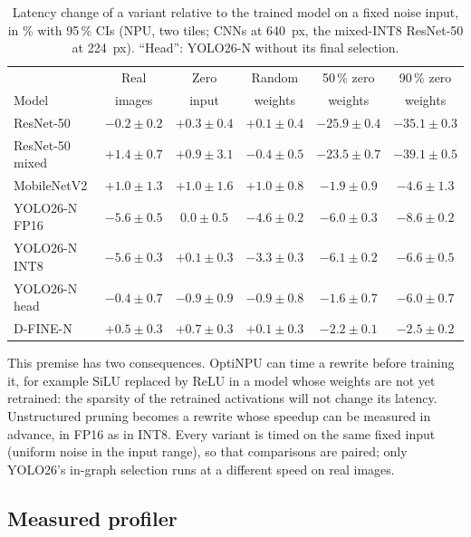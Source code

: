 \documentclass[conference]{IEEEtran}
\newcommand{\tool}{OptiNPU}
\begin{document}
\begin{table}[t]
\caption{Latency change of a variant relative to the trained model on a fixed noise input, in \% with 95\,\% CIs (NPU, two tiles; CNNs at 640~px, the mixed-INT8 ResNet-50 at 224~px). ``Head'': YOLO26-N without its final selection.}
\label{tab:premise}
\centering
\scriptsize
\setlength{\tabcolsep}{1.5pt}
\begin{tabular}{@{}lccccc@{}}
\toprule
& Real & Zero & Random & 50\,\% zero & 90\,\% zero \\
Model & images & input & weights & weights & weights \\
\midrule
ResNet-50 & $-0.2{\pm}0.2$ & $+0.3{\pm}0.4$ & $+0.1{\pm}0.4$ & $\mathbf{-25.9}{\pm}0.4$ & $\mathbf{-35.1}{\pm}0.3$ \\
ResNet-50 mixed & $+1.4{\pm}0.7$ & $+0.9{\pm}3.1$ & $-0.4{\pm}0.5$ & $\mathbf{-23.5}{\pm}0.7$ & $\mathbf{-39.1}{\pm}0.5$ \\
MobileNetV2 & $+1.0{\pm}1.3$ & $+1.0{\pm}1.6$ & $+1.0{\pm}0.8$ & $-1.9{\pm}0.9$ & $-4.6{\pm}1.3$ \\
YOLO26-N FP16 & $\mathbf{-5.6}{\pm}0.5$ & $0.0{\pm}0.5$ & $\mathbf{-4.6}{\pm}0.2$ & $-6.0{\pm}0.3$ & $-8.6{\pm}0.2$ \\
YOLO26-N INT8 & $\mathbf{-5.6}{\pm}0.3$ & $+0.1{\pm}0.3$ & $\mathbf{-3.3}{\pm}0.3$ & $-6.1{\pm}0.2$ & $-6.6{\pm}0.5$ \\
YOLO26-N head & $-0.4{\pm}0.7$ & $-0.9{\pm}0.9$ & $-0.9{\pm}0.8$ & $-1.6{\pm}0.7$ & $-6.0{\pm}0.7$ \\
D-FINE-N & $+0.5{\pm}0.3$ & $+0.7{\pm}0.3$ & $+0.1{\pm}0.3$ & $-2.2{\pm}0.1$ & $-2.5{\pm}0.2$ \\
\bottomrule
\end{tabular}
\end{table}

This premise has two consequences. \tool{} can time a rewrite before training it, for example SiLU replaced by ReLU in a model whose weights are not yet retrained: the sparsity of the retrained activations will not change its latency. Unstructured pruning becomes a rewrite whose speedup can be measured in advance, in FP16 as in INT8. Every variant is timed on the same fixed input (uniform noise in the input range), so that comparisons are paired; only YOLO26's in-graph selection runs at a different speed on real images.

\subsection{Measured profiler}
\label{sec:profiler}
\end{document}
